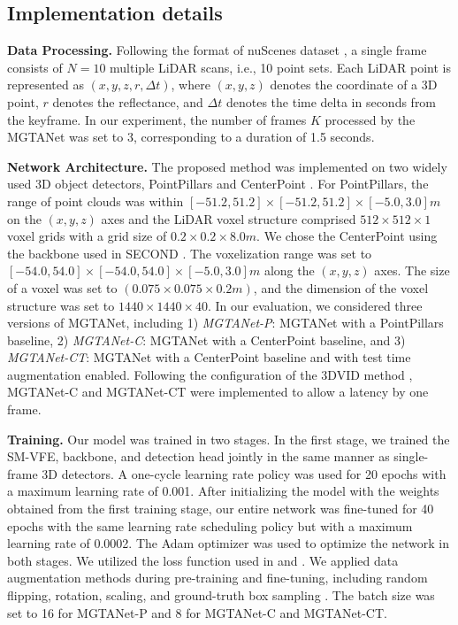 \documentclass[letterpaper]{article} \usepackage{aaai23}  \usepackage{times}  \usepackage{helvet}  \usepackage{courier}  \usepackage[hyphens]{url}  \usepackage{graphicx} \urlstyle{rm} \def\UrlFont{\rm}  \usepackage{natbib}  \usepackage{caption} \frenchspacing  \setlength{\pdfpagewidth}{8.5in} \usepackage{algorithm}
\begin{document}
\subsection{Implementation details}
{\bf Data Processing.} Following the format of nuScenes dataset \cite{nuscenes}, a single frame consists of $N=10$ multiple LiDAR scans, i.e., 10 point sets. Each LiDAR point is represented as $(x,y,z,r,\Delta t)$, where $(x,y,z)$ denotes the coordinate of a 3D point, $r$ denotes the reflectance, and $\Delta t$ denotes the time delta in seconds from the keyframe. In our experiment, the number of frames  $K$ processed by the MGTANet was set to 3, corresponding to a duration of 1.5 seconds. 

\noindent
\textbf{Network Architecture.}
The proposed method was implemented on two widely used 3D object detectors, PointPillars \cite{pointpillars} and CenterPoint \cite{centerpoint}. For PointPillars, the range of point clouds was within $[-51.2,51.2]\times[-51.2,51.2]\times[-5.0,3.0]m$ on the $(x,y,z)$ axes and the LiDAR voxel structure comprised $512 \times 512 \times 1$ voxel grids with a grid size of $0.2 \times 0.2 \times 8.0m$. We chose the CenterPoint \cite{centerpoint} using the backbone used in SECOND \cite{second}. The voxelization range was set to $[-54.0,54.0]\times[-54.0,54.0]\times[-5.0,3.0]m$ along the $(x,y,z)$ axes. The size of a voxel was set to $(0.075 \times 0.075 \times 0.2m)$, and the dimension of the voxel structure was set to $1440 \times 1440 \times 40$.
In our evaluation, we considered three versions of MGTANet, including 1) {\it MGTANet-P}: MGTANet with a PointPillars baseline, 2) {\it MGTANet-C}: MGTANet with a CenterPoint baseline, and 3) {\it MGTANet-CT}: MGTANet with a CenterPoint baseline and with test time augmentation \cite{tta} enabled. Following the configuration of the 3DVID method \cite{3DVID_TPAMI}, MGTANet-C and MGTANet-CT were implemented to allow a latency by one frame.

\noindent
{\bf Training.} Our model was trained in two stages. In the first stage, we trained the SM-VFE, backbone, and detection head jointly in the same manner as single-frame 3D detectors. A one-cycle learning rate policy was used for 20 epochs with a maximum learning rate of 0.001. After initializing the model with the weights obtained from the first training stage, our entire network was fine-tuned for 40 epochs with the same learning rate scheduling policy but with a maximum learning rate of 0.0002. The Adam optimizer was used to optimize the network in both stages. We utilized the loss function used in \cite{pointpillars} and \cite{centerpoint}. We applied data augmentation methods during pre-training and fine-tuning, including random flipping, rotation, scaling, and ground-truth box sampling \cite{second}. The batch size was set to 16 for MGTANet-P and 8 for MGTANet-C and MGTANet-CT.
\end{document}
